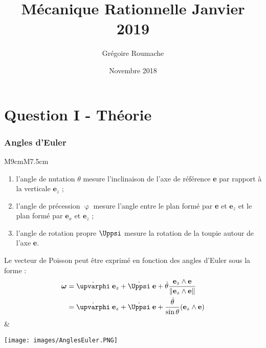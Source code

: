 \documentclass[a4paper]{article}
\title{Mécanique Rationnelle Janvier 2019}
\author{Grégoire Roumache}
\date{Novembre 2018}
\begin{document}
\maketitle










\part{Question I - Théorie}















\section{Angles d'Euler}





\begin{tabular}{M{9cm}M{7.5cm}}
\begin{enumerate}
    \item l’angle de nutation $ \theta $ mesure l’inclinaison de l’axe de référence \textbf{e} par rapport à la verticale $ \textbf{e}_z $ ;
    \item l’angle de précession $ \upvarphi $ mesure l’angle entre le plan formé par \textbf{e} et $ \textbf{e}_z $ et le plan formé par $ \textbf{e}_x $ et $ \textbf{e}_z $ ;
    \item l’angle de rotation propre $ \Uppsi $ mesure la rotation de la toupie autour de l’axe \textbf{e}.
\end{enumerate}
Le vecteur de Poisson peut être exprimé en fonction des angles d’Euler sous la forme :
\[ \begin{aligned}
\boldsymbol{\omega} &= \dot{\upvarphi} \; \textbf{e}_z + \dot{\Uppsi} \; \textbf{e} + \dot{\theta} \frac{\textbf{e}_z \wedge \textbf{e}}{\| \textbf{e}_z \wedge \textbf{e} \|} \\
&= \dot{\upvarphi} \; \textbf{e}_z + \dot{\Uppsi} \; \textbf{e} + \frac{\dot{\theta}}{\sin \theta} (\textbf{e}_z \wedge \textbf{e})
\end{aligned} \]
&
\begin{center} \texttt{[image: images/AnglesEuler.PNG]} \end{center}
\end{tabular}
\end{document}
